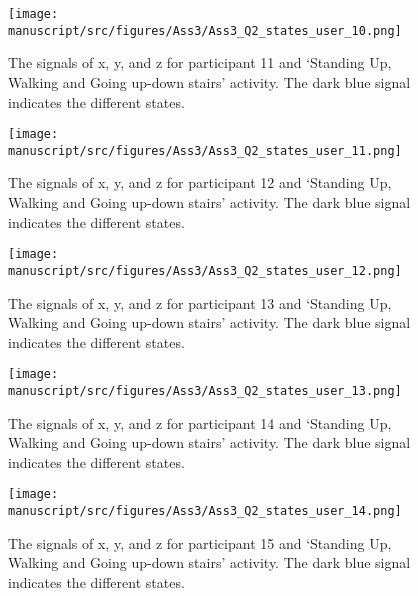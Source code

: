 \begin{figure}[H]
    \centering
    \begin{minipage}[b]{1\textwidth}
        \texttt{[image: manuscript/src/figures/Ass3/Ass3\_Q2\_states\_user\_10.png]}
    \end{minipage}
    \caption{The signals of x, y, and z for participant 11 and ‘Standing  Up,  Walking  and  Going  up-down  stairs’ activity. The dark blue signal indicates the different states.}
    \label{fig:Ass3_Q2_states_user_10}
\end{figure}
\begin{figure}[H]
    \centering
    \begin{minipage}[b]{1\textwidth}
        \texttt{[image: manuscript/src/figures/Ass3/Ass3\_Q2\_states\_user\_11.png]}
    \end{minipage}
    \caption{The signals of x, y, and z for participant 12 and ‘Standing  Up,  Walking  and  Going  up-down  stairs’ activity. The dark blue signal indicates the different states.}
    \label{fig:Ass3_Q2_states_user_11}
\end{figure}
\begin{figure}[H]
    \centering
    \begin{minipage}[b]{1\textwidth}
        \texttt{[image: manuscript/src/figures/Ass3/Ass3\_Q2\_states\_user\_12.png]}
    \end{minipage}
    \caption{The signals of x, y, and z for participant 13 and ‘Standing  Up,  Walking  and  Going  up-down  stairs’ activity. The dark blue signal indicates the different states.}
    \label{fig:Ass3_Q2_states_user_12}
\end{figure}
\begin{figure}[H]
    \centering
    \begin{minipage}[b]{1\textwidth}
        \texttt{[image: manuscript/src/figures/Ass3/Ass3\_Q2\_states\_user\_13.png]}
    \end{minipage}
    \caption{The signals of x, y, and z for participant 14 and ‘Standing  Up,  Walking  and  Going  up-down  stairs’ activity. The dark blue signal indicates the different states.}
    \label{fig:Ass3_Q2_states_user_13}
\end{figure}
\begin{figure}[H]
    \centering
    \begin{minipage}[b]{1\textwidth}
        \texttt{[image: manuscript/src/figures/Ass3/Ass3\_Q2\_states\_user\_14.png]}
    \end{minipage}
    \caption{The signals of x, y, and z for participant 15 and ‘Standing  Up,  Walking  and  Going  up-down  stairs’ activity. The dark blue signal indicates the different states.}
    \label{fig:Ass3_Q2_states_user_14}
\end{figure}
